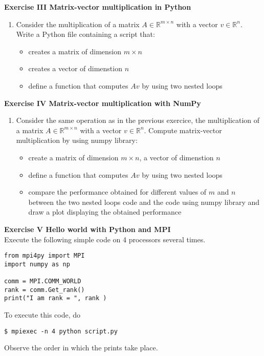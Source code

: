 \documentclass[11pt]{article}
\begin{document}
\bigskip

{\bf{Exercise III Matrix-vector multiplication in Python}}\\
\begin{enumerate}
\item Consider the multiplication of a matrix $A \in \mathbb{R}^{m \times n}$ with a vector $v \in \mathbb{R}^n$.  Write a Python file containing a script that:
\begin{itemize}
\item creates a matrix of dimension $m \times n$
\item creates a vector of dimenstion $n$
\item define a function that computes $A v$ by using two nested loops
\end{itemize}
\end{enumerate}

\bigskip

{\bf{Exercise IV Matrix-vector multiplication with NumPy}}\\
\begin{enumerate}
\item Consider the same operation as in the previous exercice, the
  multiplication of a matrix $A \in \mathbb{R}^{m \times n}$ with a
  vector $v \in \mathbb{R}^n$.  Compute matrix-vector multiplication by using numpy library:
\begin{itemize}
\item create a matrix of dimension $m \times n$, a vector of dimenstion $n$
\item define a function that computes $A v$ by using two nested loops
\item compare the performance obtained for different values of $m$ and $n$ between the two nested loops code and the code using numpy library and draw a plot displaying the obtained performance
\end{itemize}
\end{enumerate}

{\bf{Exercise V Hello world with Python and MPI}}\\
Execute the following simple code on 4 processors several times. 
\begin{verbatim}
from mpi4py import MPI 
import numpy as np  

comm = MPI.COMM_WORLD
rank = comm.Get_rank()
print("I am rank = ", rank )
\end{verbatim}
To execute this code, do
\begin{verbatim}
$ mpiexec -n 4 python script.py
\end{verbatim}
Observe the order in which the prints take place.
\end{document}
